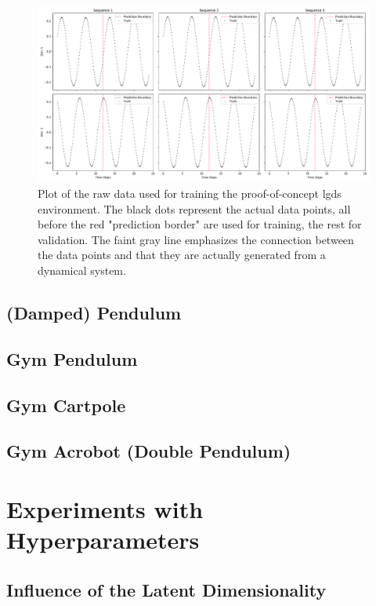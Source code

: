 		\begin{figure}
			\centering
			\includegraphics[width=\linewidth]{figures/experiments/environments/observations-lgds.pdf}
			\caption{Plot of the raw data used for training the proof-of-concept \ac{lgds} environment. The black dots represent the actual data points, all before the red "prediction border" are used for training, the rest for validation. The faint gray line emphasizes the connection between the data points and that they are actually generated from a dynamical system.}
			\label{fig:envLgds}
		\end{figure}

	\subsection{(Damped) Pendulum}

	\subsection{Gym Pendulum}

	\subsection{Gym Cartpole}

	\subsection{Gym Acrobot (Double Pendulum)}

\section{Experiments with Hyperparameters}


	\subsection{Influence of the Latent Dimensionality}
		\label{subsec:experimentLatentDim}

